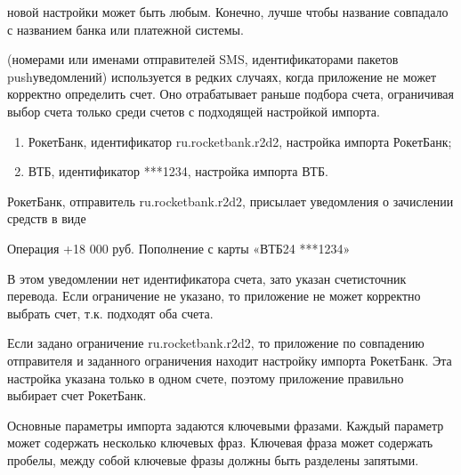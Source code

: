 \documentclass[a4paper,10pt,russian]{sphinxmanual}
\begin{document}
\noindent{}

\sphinxAtStartPar
{} новой настройки может быть любым. Конечно, лучше чтобы название совпадало с
названием банка или платежной системы.

\sphinxAtStartPar
{} (номерами или именами отправителей SMS, идентификаторами пакетов push\sphinxhyphen{}уведомлений)
используется в редких случаях, когда приложение не может корректно определить счет. Оно отрабатывает раньше
подбора счета, ограничивая выбор счета только среди счетов с подходящей настройкой импорта.
\begin{description}
\begin{enumerate}
%
\item {} 
\sphinxAtStartPar
РокетБанк, идентификатор ru.rocketbank.r2d2, настройка импорта РокетБанк;

\item {} 
\sphinxAtStartPar
ВТБ, идентификатор ***1234, настройка импорта ВТБ.

\end{enumerate}

\end{description}

\sphinxAtStartPar
РокетБанк, отправитель ru.rocketbank.r2d2, присылает уведомления о зачислении средств в виде

\begin{sphinxVerbatim}[commandchars=\\\{\}]
Операция \PYGZgt{}\PYGZgt{} +18 000 руб.
Пополнение с карты «ВТБ\PYGZhy{}24 ***1234»
\end{sphinxVerbatim}

\sphinxAtStartPar
В этом уведомлении нет идентификатора счета, зато указан счет\sphinxhyphen{}источник перевода. Если ограничение не указано,
то приложение не может корректно выбрать счет, т.к. подходят оба счета.

\sphinxAtStartPar
Если задано ограничение ru.rocketbank.r2d2, то приложение по совпадению отправителя и заданного ограничения
находит настройку импорта РокетБанк. Эта настройка указана только в одном счете, поэтому приложение правильно выбирает
счет РокетБанк.

\sphinxAtStartPar
Основные параметры импорта задаются ключевыми фразами. Каждый параметр может содержать несколько ключевых фраз.
Ключевая фраза может содержать пробелы, между собой ключевые фразы должны быть разделены запятыми.
\end{document}
